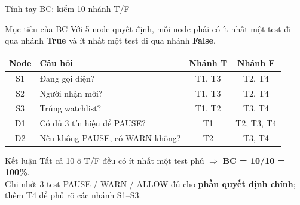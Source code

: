 \documentclass[aspectratio=169,12pt]{beamer}
\begin{document}
\begin{frame}[shrink=17]{Tính tay BC: kiểm 10 nhánh T/F}
  \begin{block}{Mục tiêu của BC}
    \small Với 5 node quyết định, mỗi node phải có ít nhất một test đi qua
    nhánh \textbf{True} và ít nhất một test đi qua nhánh \textbf{False}.
  \end{block}

  \vspace{0.1em}
  \small
  \renewcommand{\arraystretch}{1.18}
  \begin{tabularx}{\textwidth}{@{}c>{\raggedright\arraybackslash}Xcc@{}}
    \toprule
    \textbf{Node} & \textbf{Câu hỏi} & \textbf{Nhánh T} & \textbf{Nhánh F} \\
    \midrule
    S1 & Đang gọi điện? & T1, T3 & T2, T4 \\
    S2 & Người nhận mới? & T1, T3 & T2, T4 \\
    S3 & Trúng watchlist? & T1, T2 & T3, T4 \\
    D1 & Có đủ 3 tín hiệu để PAUSE? & T1 & T2, T3, T4 \\
    D2 & Nếu không PAUSE, có WARN không? & T2 & T3, T4 \\
    \bottomrule
  \end{tabularx}
  \renewcommand{\arraystretch}{1}

  \vspace{0.25em}
  \begin{exampleblock}{\small Kết luận}
    \small Tất cả 10 ô T/F đều có ít nhất một test phủ
    $\Rightarrow$ \textbf{BC = 10/10 = 100\%}.\\
    Ghi nhớ: 3 test PAUSE / WARN / ALLOW đủ cho \textbf{phần quyết định chính};
    thêm T4 để phủ rõ các nhánh S1--S3.
  \end{exampleblock}
\end{frame}
\end{document}

